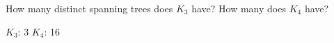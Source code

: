 \question How many distinct spanning trees does $K_3$ have? 
How many does $K_4$ have?
\begin{solution}
$K_3$: 3 \newline
$K_4$: 16
\end{solution}

\clearpage